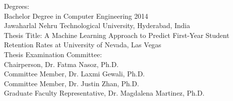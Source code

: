 \documentclass[11pt,openright]{report}
\begin{document}
\noindent Degrees:\\
\indent Bachelor Degree in Computer Engineering 2014\\
\indent Jawaharlal Nehru Technological University, Hyderabad, India\\

\noindent Thesis Title: A Machine Learning Approach to Predict First-Year Student Retention Rates at University of Nevada, Las Vegas\\

\noindent Thesis Examination Committee:\\
\indent Chairperson, Dr. Fatma Nasoz, Ph.D.\\
\indent Committee Member, Dr. Laxmi Gewali, Ph.D.\\
\indent Committee Member, Dr. Justin Zhan, Ph.D.\\
\indent Graduate Faculty Representative, Dr. Magdalena Martinez, Ph.D.\\
\end{document}
